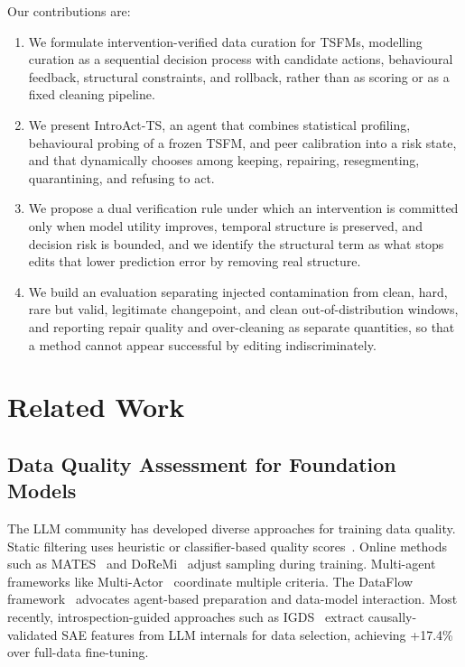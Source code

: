 \documentclass{article}
\begin{document}
Our contributions are:
\begin{enumerate}
    \item We formulate intervention-verified data curation for TSFMs, modelling curation as a sequential decision process with candidate actions, behavioural feedback, structural constraints, and rollback, rather than as scoring or as a fixed cleaning pipeline.
    \item We present IntroAct-TS, an agent that combines statistical profiling, behavioural probing of a frozen TSFM, and peer calibration into a risk state, and that dynamically chooses among keeping, repairing, resegmenting, quarantining, and refusing to act.
    \item We propose a dual verification rule under which an intervention is committed only when model utility improves, temporal structure is preserved, and decision risk is bounded, and we identify the structural term as what stops edits that lower prediction error by removing real structure.
    \item We build an evaluation separating injected contamination from clean, hard, rare but valid, legitimate changepoint, and clean out-of-distribution windows, and reporting repair quality and over-cleaning as separate quantities, so that a method cannot appear successful by editing indiscriminately.
\end{enumerate}

\section{Related Work}

\subsection{Data Quality Assessment for Foundation Models}

The LLM community has developed diverse approaches for training data quality. Static filtering uses heuristic or classifier-based quality scores~\citep{penedo2024fineweb, wettig2024qurating}. Online methods such as MATES~\citep{yu2024mates} and DoReMi~\citep{xie2023doremi} adjust sampling during training. Multi-agent frameworks like Multi-Actor~\citep{bai2025multi} coordinate multiple criteria. The DataFlow framework~\citep{liang2025dataflow, liang2026datacentric} advocates agent-based preparation and data-model interaction. Most recently, introspection-guided approaches such as IGDS~\citep{shi2026igds} extract causally-validated SAE features from LLM internals for data selection, achieving +17.4\% over full-data fine-tuning.
\end{document}
